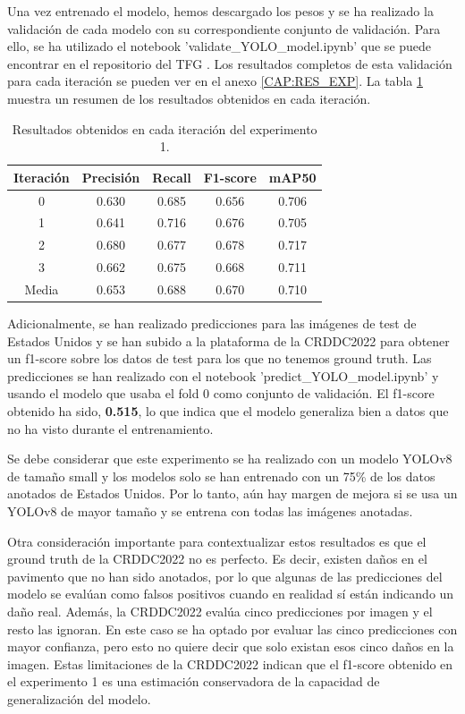 Una vez entrenado el modelo, hemos descargado los pesos y se ha realizado la validación de cada modelo con su correspondiente conjunto de validación. Para ello, se ha utilizado el notebook 'validate\_YOLO\_model.ipynb' que se puede encontrar en el repositorio del TFG \cite{TFG_Repository}. Los resultados completos de esta validación para cada iteración se pueden ver en el anexo \ref{CAP:RES_EXP}. La tabla \ref{tab:exp1_results} muestra un resumen de los resultados obtenidos en cada iteración.

\begin{table}[H]
    \centering
    \begin{tabular}{|c|c|c|c|c|}
        \hline
        \textbf{Iteración} & \textbf{Precisión} & \textbf{Recall} & \textbf{F1-score} & \textbf{mAP50} \\ \hline
        0       & 0.630 & 0.685 & 0.656 & 0.706 \\ \hline
        1       & 0.641 & 0.716 & 0.676 & 0.705 \\ \hline
        2       & 0.680 & 0.677 & 0.678 & 0.717 \\ \hline
        3       & 0.662 & 0.675 & 0.668 & 0.711 \\ \hline
        Media   & 0.653 & 0.688 & 0.670 & 0.710 \\ \hline
    \end{tabular}
    \caption{Resultados obtenidos en cada iteración del experimento 1.}
    \label{tab:exp1_results}
\end{table}

Adicionalmente, se han realizado predicciones para las imágenes de test de Estados Unidos y se han subido a la plataforma de la CRDDC2022 para obtener un f1-score sobre los datos de test para los que no tenemos ground truth. Las predicciones se han realizado con el notebook 'predict\_YOLO\_model.ipynb' y usando el modelo que usaba el fold 0 como conjunto de validación. El f1-score obtenido ha sido, \textbf{0.515}, lo que indica que el modelo generaliza bien a datos que no ha visto durante el entrenamiento.

Se debe considerar que este experimento se ha realizado con un modelo YOLOv8 de tamaño small y los modelos solo se han entrenado con un 75\% de los datos anotados de Estados Unidos. Por lo tanto, aún hay margen de mejora si se usa un YOLOv8 de mayor tamaño y se entrena con todas las imágenes anotadas.

Otra consideración importante para contextualizar estos resultados es que el ground truth de la CRDDC2022 no es perfecto. Es decir, existen daños en el pavimento que no han sido anotados, por lo que algunas de las predicciones del modelo se evalúan como falsos positivos cuando en realidad sí están indicando un daño real. Además, la CRDDC2022 evalúa cinco predicciones por imagen y el resto las ignoran. En este caso se ha optado por evaluar las cinco predicciones con mayor confianza, pero esto no quiere decir que solo existan esos cinco daños en la imagen. Estas limitaciones de la CRDDC2022 indican que el f1-score obtenido en el experimento 1 es una estimación conservadora de la capacidad de generalización del modelo.

